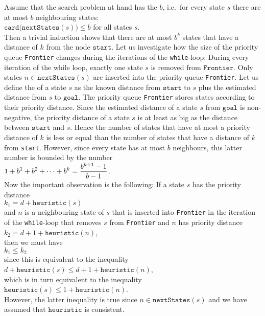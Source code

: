 Assume that the search problem at hand has the  $b$, i.e.~for every state $s$ there are
at most $b$ neighbouring states:
\\[0.2cm]
\hspace*{1.3cm}
$\texttt{card}\bigl(\texttt{nextStates}(s)\bigr) \leq b$ \quad for all states $s$.
\\[0.2cm]  
Then a trivial induction shows that there are at most $b^k$ states that have
a distance of $k$ from the node $\texttt{start}$.  Let us investigate how the size of the priority queue
\texttt{Frontier} changes during the iterations of the \texttt{while}-loop:  During every iteration of the
while loop, exactly one state $s$ is removed from $\texttt{Frontier}$.  Only states $n\in\texttt{nextStates}(s)$ 
are inserted into the priority queue \texttt{Frontier}.  Let us define the  of a state
$s$ as the known distance from $\texttt{start}$ to $s$ plus the estimated distance from $s$ to
$\texttt{goal}$.  The priority queue \texttt{Frontier} stores states according to their priority distance.
Since the estimated distance of a state $s$ from $\texttt{goal}$ is non-negative, the priority distance of a
state $s$ is at least as big as the distance between $\texttt{start}$ and $s$.  Hence the number of states that
have at most a priority distance of $k$ is less or equal than the number of states that have a 
distance of $k$ from \texttt{start}.  However, since every state has at most $b$ neighbours, this latter number
is bounded by the number
\\[0.2cm]
\hspace*{1.3cm}
$\displaystyle 1 + b^1 + b^2 + \cdots + b^k = \frac{b^{k+1}-1}{b-1}$.
\\[0.2cm]
Now the important observation is the following: If a state $s$ has the priority distance
\\[0.2cm]
\hspace*{1.3cm}
$k_1 = d + \texttt{heuristic}(s)$ 
\\[0.2cm]
and $n$ is a neighbouring state of $s$ that is inserted into \texttt{Frontier} in the iteration of the \texttt{while}-loop
that removes $s$ from \texttt{Frontier} and $n$ has priority distance
\\[0.2cm]
\hspace*{1.3cm}
$k_2 = d + 1 + \texttt{heuristic}(n)$, 
\\[0.2cm]
then we must have
\\[0.2cm]
\hspace*{1.3cm}
$k_1 \leq k_2$
\\[0.2cm]
since this is equivalent to the inequality 
\\[0.2cm]
\hspace*{1.3cm}
$d + \texttt{heuristic}(s) \leq d + 1 + \texttt{heuristic}(n)$,
\\[0.2cm]
which is in turn equivalent to the inequality
\\[0.2cm]
\hspace*{1.3cm}
$\texttt{heuristic}(s) \leq 1 + \texttt{heuristic}(n)$.
\\[0.2cm]
However, the latter inequality is true since $n \in \texttt{nextStates}(s)$ and we have assumed that
$\texttt{heuristic}$ is consistent.


